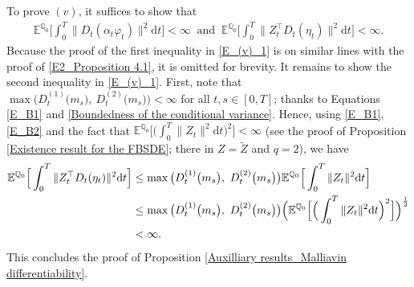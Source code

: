 \documentclass[12,reqno]{amsart}
\numberwithin{equation}{section}
\begin{document}
To prove $(v)$, it suffices to show that
\begin{align}\label{E_(v)_1}
	\mathbb{E}^{\mathbb{Q}_{0}}\Big[\int_{0}^{T}\|D_{t}(\alpha_{t}\varphi_{t})\|^{2}\mathrm{d}t\Big]<\infty~\text{ and }~\mathbb{E}^{\mathbb{Q}_{0}}\Big[\int_{0}^{T}\|Z_{t}^{\top}D_{t}(\eta_{t})\|^{2}\mathrm{d}t\Big]<\infty.
\end{align}
Because the proof of the first inequality in \eqref{E_(v)_1} is on similar lines with the proof of \eqref{E2_Proposition 4.1}, it is omitted for brevity. It remains to show the second inequality in \eqref{E_(v)_1}. First, note that $\max\big(D_{t}^{(1)}\big(m_{s}\big),~D_{t}^{(2)}\big(m_{s}\big)\big)<\infty$ for all $t,s\in[0,T]$; thanks to Equations \eqref{E_B1} and
\eqref{Boundedness of the conditional variance}. Hence, using \eqref{E_B1}, \eqref{E_B2} and the fact that $\mathbb{E}^{\mathbb{Q}_{0}}\Big[\Big(\int_{0}^{T}\|Z_{t}\|^{2}\mathrm{d}t\Big)^{2}\Big]<\infty$ (see the proof of Proposition \ref{Existence result for the FBSDE}; there in $Z=\tilde{Z}$ and $q=2$), we have
\begin{align}
	\mathbb{E}^{\mathbb{Q}_{0}}\Big[\int_{0}^{T}\|Z_{t}^{\top}D_{t}(\eta_{t})\|^{2}\mathrm{d}t\Big]&\le\max\big(D_{t}^{(1)}\big(m_{s}\big),~D_{t}^{(2)}\big(m_{s}\big)\big)\mathbb{E}^{\mathbb{Q}_{0}}\Big[\int_{0}^{T}\|Z_{t}\|^{2}\mathrm{d}t\Big]\notag\\
	&\le\max\big(D_{t}^{(1)}\big(m_{s}\big),~D_{t}^{(2)}\big(m_{s}\big)\big)\Big(\mathbb{E}^{\mathbb{Q}_{0}}\Big[\Big(\int_{0}^{T}\|Z_{t}\|^{2}\mathrm{d}t\Big)^{2}\Big]\Big)^{\frac{1}{2}}\notag\\
	&<\infty.
\end{align}
This concludes the proof of Proposition \ref{Auxilliary results_Malliavin differentiability}.
\end{document}
